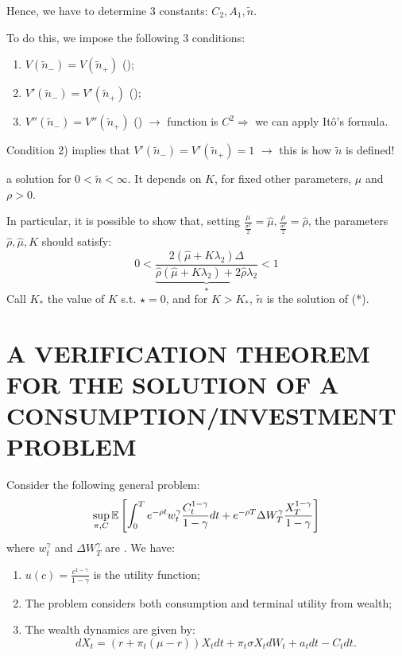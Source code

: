 Hence, we have to determine 3 constants: $C_2, A_1, \tilde{n}$.

To do this, we impose the following 3 conditions:
\begin{enumerate}
    \item $V(\tilde{n}_-) = V(\tilde{n}_+)$ ();
    \item $V'(\tilde{n}_-) = V'(\tilde{n}_+)$ ();
    \item $V''(\tilde{n}_-) = V''(\tilde{n}_+)$ () $\rightarrow$ function is $C^2 \Rightarrow$ we can apply Itô's formula.
\end{enumerate}

Condition 2) implies that $V'(\tilde{n}_-) = V'(\tilde{n}_+) = 1$ {\color{red} $\rightarrow$ this is how $\tilde{n}$ is defined!}

a solution for $0 < \tilde{n} < \infty$. It depends on $K$, for fixed other parameters, $\mu$ and $\rho > 0$.

In particular, it is possible to show that, setting $\frac{\mu}{\frac{\sigma^2}{2}} = \hat{\mu}, \frac{\rho}{\frac{\sigma^2}{2}} = \hat{\rho}$, the parameters $\hat{\rho}, \hat{\mu}, K$ should satisfy:
\begin{equation*}
    0 < \underbrace{\frac{2 (\hat{\mu} + K \lambda_2) \Delta}{\hat{\rho} (\hat{\mu} + K \lambda_2) + 2 \hat{\rho} \lambda_2}}_{\star} < 1
\end{equation*}
Call $K_*$ the value of $K$ s.t. $\star = 0$, and for $K > K_*$, $\tilde{n}$ is the solution of {\color{red}(*)}.

\section*{\color{red}A VERIFICATION THEOREM FOR THE SOLUTION OF A CONSUMPTION/INVESTMENT PROBLEM}

Consider the following general problem:
\begin{equation*}
    \sup_{\pi, C} \mathbb E \left[ \int_0^T e^{-\rho t} w_t^\gamma \frac{C_t^{1-\gamma}}{1-\gamma} dt + e^{-\rho T} \Delta W_T^\gamma \frac{X_T^{1-\gamma}}{1-\gamma} \right]
\end{equation*}
where $w_t^\gamma$ and $\Delta W_T^\gamma$ are . We have:
\begin{enumerate}[label=(\alph*)]
    \item $u(c) = \frac{c^{1-\gamma}}{1-\gamma}$ is the utility function;
    \item The problem considers both consumption and terminal utility from wealth;
    \item The wealth dynamics are given by:
    \begin{equation*}
        dX_t = (r + \pi_t(\mu - r)) X_t dt + \pi_t \sigma X_t dW_t + a_t dt - C_t dt.
    \end{equation*}
\end{enumerate}

